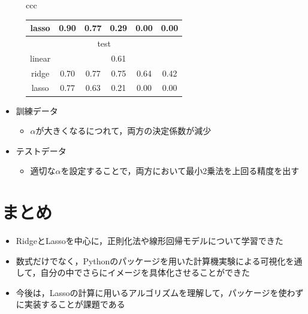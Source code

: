 \documentclass[dvipdfmx, 10pt]{beamer}
\begin{document}
\begin{frame}{\insertsubsection}
\begin{figure}[H]
\begin{tabular}{ccc}
\begin{minipage}{0.6\hsize}
\begin{table}[H]
\begin{tabular}{|c|c|c|c|c|c|}
                        		lasso & 0.90 & 0.77 & 0.29 & 0.00 & 0.00\\
                        		\hline
                        		\hline
                        		\multicolumn{6}{|c|}{test} \\
                        		\hline
                        		linear & \multicolumn{5}{|c|}{0.61} \\
                        		\hline
                        		ridge & 0.70 & 0.77 & 0.75 &0.64 & 0.42\\
                        		\hline
                        		lasso & 0.77 & 0.63 & 0.21 & 0.00 & 0.00 \\
                        		\hline
                                	\end{tabular}
                        	\label{tab:score}
                    \end{table}
             \end{minipage}
    	\end{tabular}
    \end{figure}
    \begin{itemize}
        \item 訓練データ
         \begin{itemize}
            \item $\alpha$が大きくなるにつれて，両方の決定係数が減少
        \end{itemize}
       \item テストデータ
         \begin{itemize}
            \item 適切な$\alpha$を設定することで，両方において最小2乗法を上回る精度を出す
        \end{itemize}
    \end{itemize}
\end{frame}

\section{まとめ}
\begin{frame}{\insertsection}
    
    \begin{itemize}
        \item RidgeとLassoを中心に，正則化法や線形回帰モデルについて学習できた
        \item 数式だけでなく，Pythonのパッケージを用いた計算機実験による可視化を通して，自分の中でさらにイメージを具体化させることができた
        \item 今後は，Lassoの計算に用いるアルゴリズムを理解して，パッケージを使わずに実装することが課題である
    \end{itemize}
\end{frame}
\end{document}
